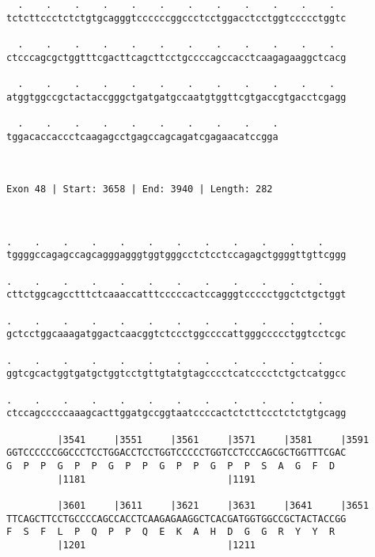 \documentclass{article}
\begin{document}
\begin{Verbatim}
  .    .    .    .    .    .    .    .    .    .    .    .  
tctcttccctctctgtgcagggtccccccggccctcctggacctcctggtccccctggtc
                                                            
  .    .    .    .    .    .    .    .    .    .    .    .  
ctcccagcgctggtttcgacttcagcttcctgccccagccacctcaagagaaggctcacg
                                                            
  .    .    .    .    .    .    .    .    .    .    .    .  
atggtggccgctactaccgggctgatgatgccaatgtggttcgtgaccgtgacctcgagg
                                                            
  .    .    .    .    .    .    .    .    .    .
tggacaccaccctcaagagcctgagccagcagatcgagaacatccgga
                                                
                                                
 
Exon 48 | Start: 3658 | End: 3940 | Length: 282



.    .    .    .    .    .    .    .    .    .    .    .    
tggggccagagccagcagggagggtggtgggcctctcctccagagctggggttgttcggg
                                                            
.    .    .    .    .    .    .    .    .    .    .    .    
cttctggcagcctttctcaaaccatttcccccactccagggtccccctggctctgctggt
                                                            
.    .    .    .    .    .    .    .    .    .    .    .    
gctcctggcaaagatggactcaacggtctccctggccccattgggccccctggtcctcgc
                                                            
.    .    .    .    .    .    .    .    .    .    .    .    
ggtcgcactggtgatgctggtcctgttgtatgtagcccctcatcccctctgctcatggcc
                                                            
.    .    .    .    .    .    .    .    .    .    .    .    
ctccagcccccaaagcacttggatgccggtaatccccactctcttccctctctgtgcagg
                                                            
         |3541     |3551     |3561     |3571     |3581     |3591
GGTCCCCCCGGCCCTCCTGGACCTCCTGGTCCCCCTGGTCCTCCCAGCGCTGGTTTCGAC
G  P  P  G  P  P  G  P  P  G  P  P  G  P  P  S  A  G  F  D  
         |1181                         |1191                
  
         |3601     |3611     |3621     |3631     |3641     |3651
TTCAGCTTCCTGCCCCAGCCACCTCAAGAGAAGGCTCACGATGGTGGCCGCTACTACCGG
F  S  F  L  P  Q  P  P  Q  E  K  A  H  D  G  G  R  Y  Y  R  
         |1201                         |1211                
  

\end{Verbatim}
\end{document}
